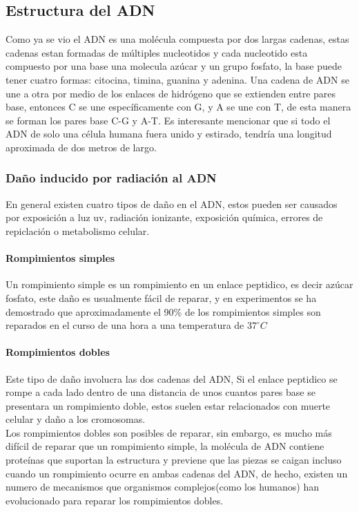 \subsection{Estructura del ADN}
Como ya se vio el ADN es una molécula compuesta por dos largas cadenas, estas cadenas estan formadas de múltiples nucleotidos y cada nucleotido esta compuesto por una base una molecula azúcar y un grupo fosfato, la base puede tener cuatro formas: citocina, timina, guanina y adenina. Una cadena de ADN se une a otra por medio de los enlaces de hidrógeno que se extienden entre pares base, entonces C se une específicamente con G, y A se une con T, de esta manera se forman los pares base C-G y A-T.
Es interesante mencionar que si todo el ADN de solo una célula humana fuera unido y estirado, tendría una longitud aproximada de dos metros de largo.


\subsubsection{Daño inducido por radiación al ADN}
En general existen cuatro tipos de daño en el ADN, estos pueden ser causados por exposición a luz uv, radiación ionizante, exposición química, errores de repiclación o metabolismo celular.
\paragraph{Rompimientos simples}
Un rompimiento simple es un rompimiento en un enlace peptidico, es decir azúcar fosfato, este daño es usualmente fácil de reparar, y en experimentos  se ha demostrado que aproximadamente el 90\% de los rompimientos simples son reparados en el curso de una hora a una temperatura de $37^{\circ} C$ \cite{Thormod}

\paragraph{Rompimientos dobles}

Este tipo de daño involucra las dos cadenas  del ADN, Si el enlace peptidico se rompe a cada lado dentro de una distancia de unos cuantos pares base se presentara un rompimiento doble, estos suelen estar relacionados con muerte celular y daño a los cromosomas.\\
Los rompimientos dobles son posibles de reparar, sin embargo, es mucho más difícil de reparar que un rompimiento simple,
la molécula de ADN contiene proteínas que suportan la estructura y previene que las piezas se caigan incluso cuando un rompimiento ocurre en ambas cadenas del ADN, de hecho, existen un numero de mecanismos que organismos complejos(como los humanos) han evolucionado para reparar los rompimientos dobles\cite{Thormod}.

